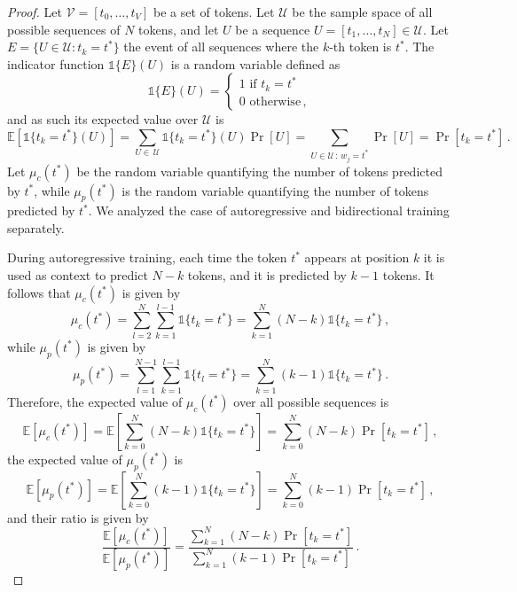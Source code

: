 \begin{proof}
%
Let $\mathcal{V} = [t_0, \dots, t_V]$ be a set of tokens.
%
Let $\mathcal{U}$ be the sample space of all possible sequences of $N$ tokens, and let $U$ be a sequence $U = [t_1, \dots, t_N] \in\mathcal{U}$.
%
Let $E = \{U \in \mathcal{U}: t_k = t^*\}$ the event of all sequences where the $k$-th token is $t^*$. 
%
The indicator function $\mathds{1}\{E\}(U)$ is a random variable defined as
%
\begin{equation}
\mathds{1}\{E\}(U) =
\begin{cases}
    1 \,\,\text{if} \,\,t_k = t^*\\
    0 \,\, \text{otherwise} \,,
\end{cases}
\end{equation}
%
and as such its expected value over $\mathcal{U}$ is
%
\begin{equation}
\mathbb{E}\left[\mathds{1}\{t_k = t^*\}(U)\right] = \sum_{U \in \,\mathcal{U}} \mathds{1}\{t_k = t^*\}(U)\Pr[U] = \sum_{U \in \mathcal{U} \,:\, w_j = t^*} \Pr[U] = \Pr[t_k = t^*] \,.
\end{equation}
%  
Let $\mu_c(t^*)$ be the random variable quantifying the number of tokens predicted by $t^*$, while $\mu_p(t^*)$ is the random variable quantifying the number of tokens predicted by $t^*$.
%
We analyzed the case of autoregressive and bidirectional training separately.
%

During autoregressive training, each time the token $t^*$ appears at position $k$ it is used as context to predict $N-k$ tokens, and it is predicted by $k-1$ tokens.
%
It follows that $\mu_c(t^*)$ is given by 
%
\begin{equation}
\mu_c(t^*) = \sum_{l=2}^N\sum_{k=1}^{l-1} \mathds{1}\{t_k = t^*\} = \sum_{k=1}^N (N-k)\mathds{1}\{t_k = t^*\}\,,
\end{equation}
%
while $\mu_p(t^*)$ is given by 
%
\begin{equation}
\mu_p(t^*) = \sum_{l=1}^{N-1}\sum_{k=1}^{l-1} \mathds{1}\{t_l = t^*\} = \sum_{k=1}^N (k-1)\mathds{1}\{t_k = t^*\}\,.
\end{equation}
%
Therefore, the expected value of $\mu_c(t^*)$ over all possible sequences is
%
\begin{equation}
\mathbb{E}[\mu_c(t^*)] = \mathbb{E}\left[\sum_{k=0}^N (N-k)\mathds{1}\{t_k = t^*\}\right] =   \sum_{k=0}^N(N-k)\Pr[t_k = t^*]\,,
\end{equation}
%
the expected value of $\mu_p(t^*)$ is
%
\begin{equation}
\mathbb{E}[\mu_p(t^*)] = \mathbb{E}\left[\sum_{k=0}^N (k-1)\mathds{1}\{t_k = t^*\}\right] =   \sum_{k=0}^N(k-1)\Pr[t_k = t^*]\,,
\end{equation}
%
and their ratio is given by
%
\begin{equation}
    \frac{\mathbb{E}[\mu_c(t^*)]}{\mathbb{E}[\mu_p(t^*)]} = \frac{\sum_{k=1}^N (N-k)\Pr[t_k = t^*]}{\sum_{k=1}^N(k-1)\Pr[t_k = t^*]} \,.
\end{equation}
%


\end{proof}
